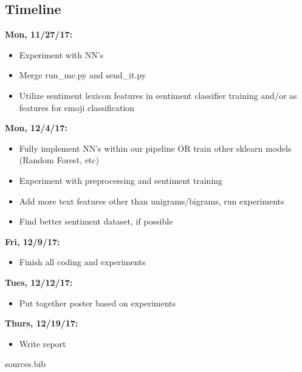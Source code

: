 \documentclass[10pt]{article}
\begin{document}
\subsection{Timeline}

\textbf{Mon, 11/27/17:} 
\begin{itemize}
\item Experiment with NN's
\item Merge run\_me.py and send\_it.py
\item Utilize sentiment lexicon features in sentiment classifier training and/or as features for emoji classification
\end{itemize}

\textbf{Mon, 12/4/17:} 
\begin{itemize}
\item Fully implement NN's within our pipeline OR train other sklearn models (Random Forest, etc)
\item Experiment with preprocessing and sentiment training
\item Add more text features other than unigrams/bigrams, run experiments
\item Find better sentiment dataset, if possible
\end{itemize}

\textbf{Fri, 12/9/17:} 
\begin{itemize}
\item Finish all coding and experiments
\end{itemize}

\textbf{Tues, 12/12/17:}
\begin{itemize}
\item Put together poster based on experiments
\end{itemize}

\textbf{Thurs, 12/19/17:}
\begin{itemize}
\item Write report
\end{itemize}

 {sources.bib} 

\end{document}
